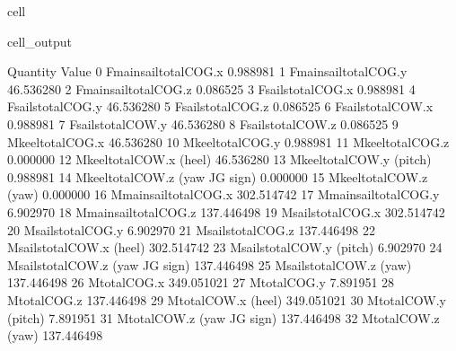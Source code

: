 \documentclass[letterpaper,10pt,english]{jupyterBook}
\begin{document}
\begin{sphinxuseclass}{cell}
\begin{sphinxVerbatimOutput}
\begin{sphinxuseclass}{cell_output}
\begin{sphinxVerbatim}[commandchars=\\\{\}]
                               Quantity       Value
0               F\PYGZus{}main\PYGZus{}sail\PYGZus{}total\PYGZus{}COG.x    0.988981
1               F\PYGZus{}main\PYGZus{}sail\PYGZus{}total\PYGZus{}COG.y   46.536280
2               F\PYGZus{}main\PYGZus{}sail\PYGZus{}total\PYGZus{}COG.z   \PYGZhy{}0.086525
3                   F\PYGZus{}sails\PYGZus{}total\PYGZus{}COG.x    0.988981
4                   F\PYGZus{}sails\PYGZus{}total\PYGZus{}COG.y   46.536280
5                   F\PYGZus{}sails\PYGZus{}total\PYGZus{}COG.z   \PYGZhy{}0.086525
6                   F\PYGZus{}sails\PYGZus{}total\PYGZus{}COW.x    0.988981
7                   F\PYGZus{}sails\PYGZus{}total\PYGZus{}COW.y   46.536280
8                   F\PYGZus{}sails\PYGZus{}total\PYGZus{}COW.z   \PYGZhy{}0.086525
9                    M\PYGZus{}keel\PYGZus{}total\PYGZus{}COG.x  \PYGZhy{}46.536280
10                   M\PYGZus{}keel\PYGZus{}total\PYGZus{}COG.y    0.988981
11                   M\PYGZus{}keel\PYGZus{}total\PYGZus{}COG.z    0.000000
12            M\PYGZus{}keel\PYGZus{}total\PYGZus{}COW.x (heel)  \PYGZhy{}46.536280
13           M\PYGZus{}keel\PYGZus{}total\PYGZus{}COW.y (pitch)    0.988981
14   M\PYGZus{}keel\PYGZus{}total\PYGZus{}COW.z (yaw \PYGZhy{} JG sign)   \PYGZhy{}0.000000
15             M\PYGZus{}keel\PYGZus{}total\PYGZus{}COW.z (yaw)    0.000000
16              M\PYGZus{}main\PYGZus{}sail\PYGZus{}total\PYGZus{}COG.x \PYGZhy{}302.514742
17              M\PYGZus{}main\PYGZus{}sail\PYGZus{}total\PYGZus{}COG.y    6.902970
18              M\PYGZus{}main\PYGZus{}sail\PYGZus{}total\PYGZus{}COG.z  137.446498
19                  M\PYGZus{}sails\PYGZus{}total\PYGZus{}COG.x \PYGZhy{}302.514742
20                  M\PYGZus{}sails\PYGZus{}total\PYGZus{}COG.y    6.902970
21                  M\PYGZus{}sails\PYGZus{}total\PYGZus{}COG.z  137.446498
22           M\PYGZus{}sails\PYGZus{}total\PYGZus{}COW.x (heel) \PYGZhy{}302.514742
23          M\PYGZus{}sails\PYGZus{}total\PYGZus{}COW.y (pitch)    6.902970
24  M\PYGZus{}sails\PYGZus{}total\PYGZus{}COW.z (yaw \PYGZhy{} JG sign) \PYGZhy{}137.446498
25            M\PYGZus{}sails\PYGZus{}total\PYGZus{}COW.z (yaw)  137.446498
26                        M\PYGZus{}total\PYGZus{}COG.x \PYGZhy{}349.051021
27                        M\PYGZus{}total\PYGZus{}COG.y    7.891951
28                        M\PYGZus{}total\PYGZus{}COG.z  137.446498
29                 M\PYGZus{}total\PYGZus{}COW.x (heel) \PYGZhy{}349.051021
30                M\PYGZus{}total\PYGZus{}COW.y (pitch)    7.891951
31        M\PYGZus{}total\PYGZus{}COW.z (yaw \PYGZhy{} JG sign) \PYGZhy{}137.446498
32                  M\PYGZus{}total\PYGZus{}COW.z (yaw)  137.446498
\end{sphinxVerbatim}

\end{sphinxuseclass}\end{sphinxVerbatimOutput}

\end{sphinxuseclass}
\end{document}

